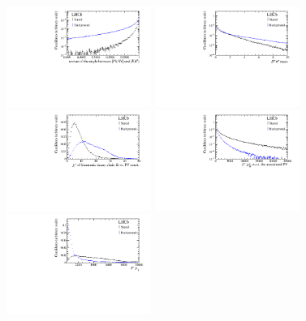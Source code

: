 \begin{figure}[tbp]
	\begin{center}
		\includegraphics[width=0.42\textwidth]{07selection/figs/BDTInputs/ab0_DIRA_OWNPV.pdf}
		\includegraphics[width=0.42\textwidth]{07selection/figs/BDTInputs/ab0_ENDVERTEX_CHI2.pdf}\\
		\includegraphics[width=0.42\textwidth]{07selection/figs/BDTInputs/ab0_FitPVConst_chi2_flat.pdf}
		\includegraphics[width=0.42\textwidth]{07selection/figs/BDTInputs/ab1_IPCHI2_OWNPV.pdf}\\
		\includegraphics[width=0.42\textwidth]{07selection/figs/BDTInputs/ab1_PT.pdf}

\end{center}
\end{figure}
